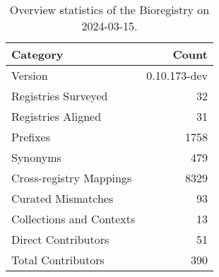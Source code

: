 \begin{table}
\caption{Overview statistics of the Bioregistry on 2024-03-15.}
\label{tab:bioregistry-summary}
\begin{tabular}{lr}
\toprule
Category & Count \\
\midrule
Version & 0.10.173-dev \\
Registries Surveyed & 32 \\
Registries Aligned & 31 \\
Prefixes & 1758 \\
Synonyms & 479 \\
Cross-registry Mappings & 8329 \\
Curated Mismatches & 93 \\
Collections and Contexts & 13 \\
Direct Contributors & 51 \\
Total Contributors & 390 \\
\bottomrule
\end{tabular}
\end{table}
